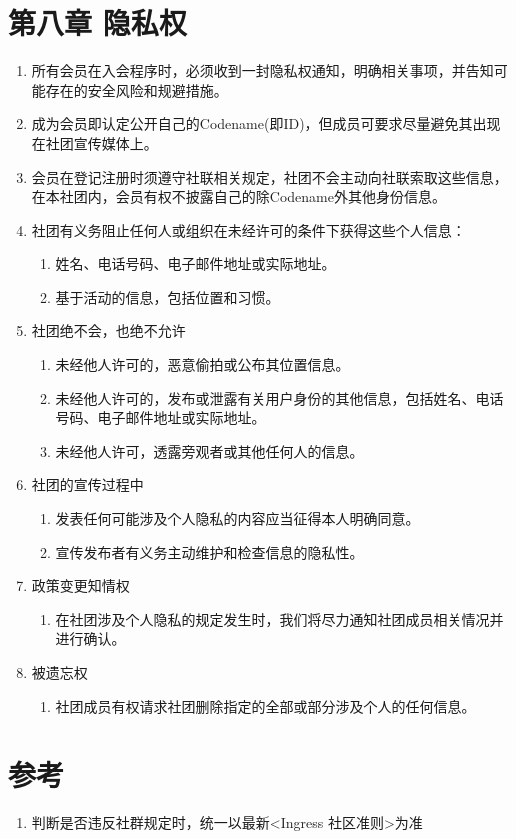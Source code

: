 \documentclass[a4paper]{article}
\newcommand\liststyleWWNumi{%
\renewcommand\theenumi{\arabic{enumi}}
\renewcommand\theenumii{\arabic{enumi}.\arabic{enumii}}
\renewcommand\theenumiii{\arabic{enumi}.\arabic{enumii}.\arabic{enumiii}}
\renewcommand\theenumiv{\arabic{enumi}.\arabic{enumii}.\arabic{enumiii}.\arabic{enumiv}}
\renewcommand\labelenumi{\theenumi.}
\renewcommand\labelenumii{\theenumii.}
\renewcommand\labelenumiii{\theenumiii.}
\renewcommand\labelenumiv{\theenumiv.}
}
\newcommand\liststyleWWNumii{%
\renewcommand\theenumi{\arabic{enumi}}
\renewcommand\theenumii{\arabic{enumi}.\arabic{enumii}}
\renewcommand\theenumiii{\arabic{enumi}.\arabic{enumii}.\arabic{enumiii}}
\renewcommand\theenumiv{\arabic{enumi}.\arabic{enumii}.\arabic{enumiii}.\arabic{enumiv}}
\renewcommand\labelenumi{\theenumi.}
\renewcommand\labelenumii{\theenumii.}
\renewcommand\labelenumiii{\theenumiii.}
\renewcommand\labelenumiv{\theenumiv.}
}
\begin{document}
\section[第八章 隐私权]{第八章 隐私权}
\liststyleWWNumi
\begin{enumerate}
\item 所有会员在入会程序时，必须收到一封隐私权通知，明确相关事项，并告知可能存在的安全风险和规避措施。
\item 成为会员即认定公开自己的Codename(即ID)，但成员可要求尽量避免其出现在社团宣传媒体上。
\item 会员在登记注册时须遵守社联相关规定，社团不会主动向社联索取这些信息，在本社团内，会员有权不披露自己的除Codename外其他身份信息。
\item 社团有义务阻止任何人或组织在未经许可的条件下获得这些个人信息：

\begin{enumerate}
\item 姓名、电话号码、电子邮件地址或实际地址。
\item 基于活动的信息，包括位置和习惯。
\end{enumerate}
\item 社团绝不会，也绝不允许

\begin{enumerate}
\item 未经他人许可的，恶意偷拍或公布其位置信息。
\item 未经他人许可的，发布或泄露有关用户身份的其他信息，包括姓名、电话号码、电子邮件地址或实际地址。
\item 未经他人许可，透露旁观者或其他任何人的信息。
\end{enumerate}
\item 社团的宣传过程中

\begin{enumerate}
\item 发表任何可能涉及个人隐私的内容应当征得本人明确同意。
\item 宣传发布者有义务主动维护和检查信息的隐私性。
\end{enumerate}
\item 政策变更知情权

\begin{enumerate}
\item 在社团涉及个人隐私的规定发生时，我们将尽力通知社团成员相关情况并进行确认。
\end{enumerate}
\item 被遗忘权

\begin{enumerate}
\item 社团成员有权请求社团删除指定的全部或部分涉及个人的任何信息。
\end{enumerate}
\end{enumerate}

\bigskip

\section[参考]{参考}
\liststyleWWNumii
\begin{enumerate}
\item 判断是否违反社群规定时，统一以最新<Ingress 社区准则>为准
\end{enumerate}
\end{document}
